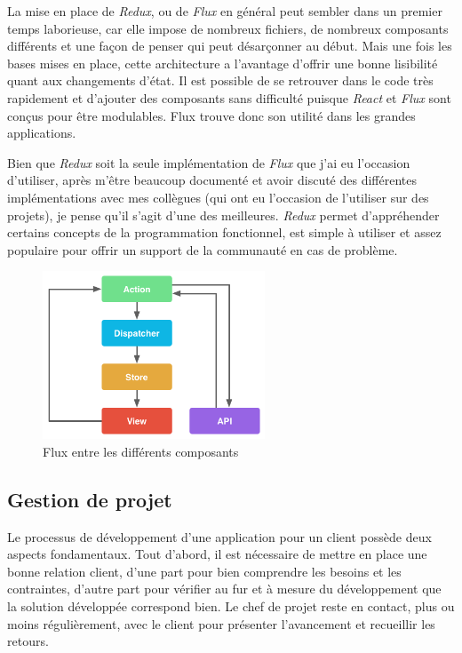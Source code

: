 \documentclass[12pt,a4paper]{article}
\begin{document}
  \bigskip

  La mise en place de \emph{Redux}, ou de \emph{Flux} en général peut
  sembler dans un premier temps laborieuse, car elle impose de nombreux
  fichiers, de nombreux composants différents et une façon de penser qui
  peut désarçonner au début. Mais une fois les bases mises en place, cette
  architecture a l'avantage d'offrir une bonne lisibilité quant aux
  changements d'état. Il est possible de se retrouver dans le code très
  rapidement et d'ajouter des composants sans difficulté puisque
  \emph{React} et \emph{Flux} sont conçus pour être modulables. Flux
  trouve donc son utilité dans les grandes applications.

  \bigskip

  Bien que \emph{Redux} soit la seule implémentation de \emph{Flux} que
  j'ai eu l'occasion d'utiliser, après m'être beaucoup documenté et avoir
  discuté des différentes implémentations avec mes collègues (qui ont eu
  l'occasion de l'utiliser sur des projets), je pense qu'il s'agit d'une
  des meilleures. \emph{Redux} permet d'appréhender certains concepts de
  la programmation fonctionnel, est simple à utiliser et assez populaire
  pour offrir un support de la communauté en cas de problème.

  \bigskip

  \begin{figure}[h]
    \centering
    \includegraphics[height=5cm]{figures/react.png}
    \caption{Flux entre les différents composants}
  \end{figure}

  \subsection{Gestion de projet}\label{gestion-de-projet}

  Le processus de développement d'une application pour un client possède
  deux aspects fondamentaux. Tout d'abord, il est nécessaire de mettre en
  place une bonne relation client, d'une part pour bien comprendre les
  besoins et les contraintes, d'autre part pour vérifier au fur et à
  mesure du développement que la solution développée correspond bien. Le
  chef de projet reste en contact, plus ou moins régulièrement, avec le
  client pour présenter l'avancement et recueillir les retours.
\end{document}
